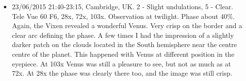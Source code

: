 \begin{itemize}
\item 23/06/2015 21:40-23:15, Cambridge, UK. 2 - Slight undulations, 5 - Clear. Tele Vue 60 F6, 28x, 72x, 103x. Observation at twilight. Phase about 40\%. Again, the Vixen revealed a wonderful Venus. Very crisp on the border and a clear arc defining the phase. A few times I had the impression of a slightly darker patch on the clouds located in the South hemisphere near the centre centre of the planet. This happened with Venus at different position in the eyepiece. At 103x Venus was still a pleasure to see, but not as much as at 72x. At 28x the phase was clearly there too, and the image was still crisp.
\end{itemize}
